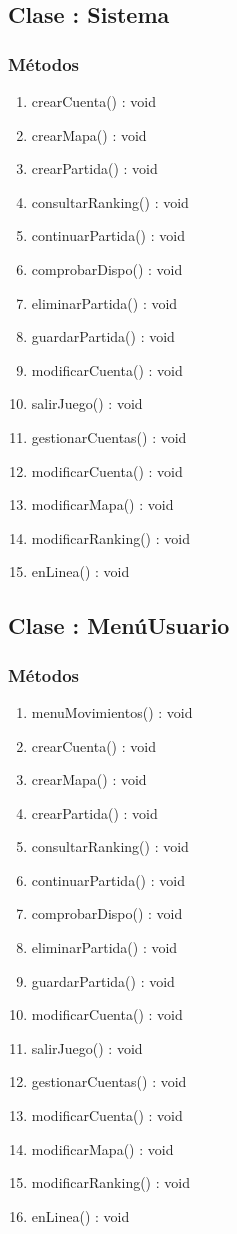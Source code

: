 \subsection{Clase : Sistema}\label{sec:uc0}
\subsubsection{Métodos}
\begin{enumerate}
\item crearCuenta() : void
\item crearMapa() : void
\item crearPartida() : void
\item consultarRanking() : void
\item continuarPartida() : void
\item comprobarDispo() : void
\item eliminarPartida() : void
\item guardarPartida() : void
\item modificarCuenta() : void
\item salirJuego() : void
\item gestionarCuentas() : void
\item modificarCuenta() : void
\item modificarMapa() : void
\item modificarRanking() : void
\item enLinea() : void
\end{enumerate}




\subsection{Clase : MenúUsuario}\label{sec:uc0}
\subsubsection{Métodos}
\begin{enumerate}
\item menuMovimientos() : void
\item crearCuenta() : void
\item crearMapa() : void
\item crearPartida() : void
\item consultarRanking() : void
\item continuarPartida() : void
\item comprobarDispo() : void
\item eliminarPartida() : void
\item guardarPartida() : void
\item modificarCuenta() : void
\item salirJuego() : void
\item gestionarCuentas() : void
\item modificarCuenta() : void
\item modificarMapa() : void
\item modificarRanking() : void
\item enLinea() : void
\end{enumerate}




